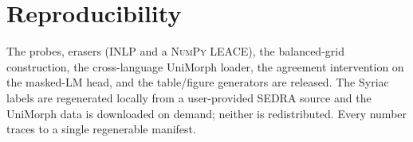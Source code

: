 \documentclass[11pt]{article}
\begin{document}
\section*{Reproducibility}
The probes, erasers (INLP and a \textsc{NumPy} LEACE), the balanced-grid
construction, the cross-language UniMorph loader, the agreement intervention on the
masked-LM head, and the table/figure generators are released. The Syriac labels are
regenerated locally from a user-provided SEDRA
source and the UniMorph data is downloaded on demand; neither is redistributed.
Every number traces to a single regenerable manifest.



\end{document}
